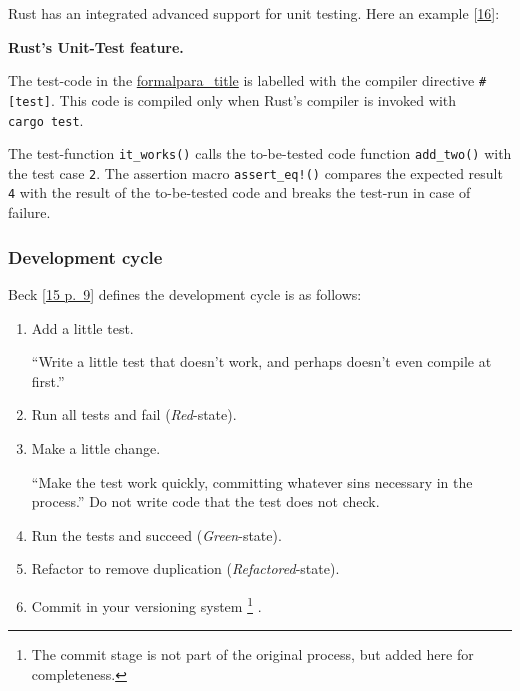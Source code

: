 Rust has an integrated advanced support for unit testing. Here an
example {[}\protect\hyperlink{rustprogramminglanguage2016}{16}{]}:

\textbf{Rust's Unit-Test feature.}

\begin{Shaded}
\begin{Highlighting}[]
  \NormalTok{) -> } \NormalTok{\{}
\NormalTok{\}}

\AttributeTok{#[}\AttributeTok{]}
 
    \NormalTok{(}\NormalTok{));}
\NormalTok{\}}
\end{Highlighting}
\end{Shaded}

The test-code in the \protect\hyperlink{unit-test}{formalpara\_title} is
labelled with the compiler directive \texttt{\#{[}test{]}}. This code is
compiled only when Rust's compiler is invoked with \texttt{cargo\ test}.

The test-function \texttt{it\_works()} calls the to-be-tested code
function \texttt{add\_two()} with the test case \texttt{2}. The
assertion macro \texttt{assert\_eq!()} compares the expected result
\texttt{4} with the result of the to-be-tested code and breaks the
test-run in case of failure.

\hypertarget{_development_cycle}{\subsubsection{Development
cycle}\label{_development_cycle}}

Beck {[}\protect\hyperlink{beck2003}{15 p.~9}{]} defines the development
cycle is as follows:

\begin{enumerate}
\def\labelenumi{\arabic{enumi}.}
\item
  Add a little test.

  ``Write a little test that doesn't work, and perhaps doesn't even
  compile at first.''
\item
  Run all tests and fail (\emph{Red}-state).
\item
  Make a little change.

  ``Make the test work quickly, committing whatever sins necessary in
  the process.'' Do not write code that the test does not check.
\item
  Run the tests and succeed (\emph{Green}-state).
\item
  Refactor to remove duplication (\emph{Refactored}-state).
\item
  Commit in your versioning system \footnote{The commit stage is not
    part of the original process, but added here for completeness.} .
\end{enumerate}


